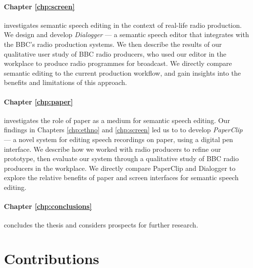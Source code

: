 \paragraph{Chapter \ref{chp:screen}} investigates semantic speech editing in the context of real-life radio production.
We design and develop \textit{Dialogger} --- a semantic speech editor that integrates with the BBC's radio production
systems.  We then describe the results of our qualitative user study of BBC radio producers, who used our editor in the
workplace to produce radio programmes for broadcast.  We directly compare semantic editing to the current production
workflow, and gain insights into the benefits and limitations of this approach.

\paragraph{Chapter \ref{chp:paper}} investigates the role of paper as a medium for semantic speech editing.  Our
findings in Chapters \ref{chp:ethno} and \ref{chp:screen} led us to to develop \textit{PaperClip} --- a novel system
for editing speech recordings on paper, using a digital pen interface. We describe how we worked with radio producers
to refine our prototype, then evaluate our system through a qualitative study of BBC radio producers in the workplace.
We directly compare PaperClip and Dialogger to explore the relative benefits of paper and screen interfaces for
semantic speech editing.

\paragraph{Chapter \ref{chp:conclusions}} concludes the thesis and considers prospects for further research.

\section{Contributions}\label{sec:intro-contributions}




